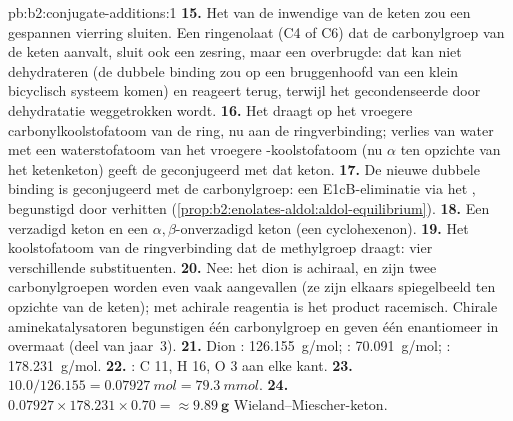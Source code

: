 \begin{solution}{pb:b2:conjugate-additions:1}
\textbf{15.} Het  van de inwendige  van de keten zou een gespannen vierring sluiten. Een
ringenolaat (C4 of C6) dat de carbonylgroep van de keten aanvalt, sluit ook een zesring, maar een overbrugde: dat 
kan niet dehydrateren (de dubbele binding zou op een bruggenhoofd van een klein bicyclisch systeem komen) en reageert terug,
terwijl het gecondenseerde  door dehydratatie weggetrokken wordt.
\textbf{16.} Het  draagt  op het vroegere carbonylkoolstofatoom van de ring, nu aan de ringverbinding; verlies
van water met een waterstofatoom van het vroegere -koolstofatoom (nu $\alpha$ ten opzichte van het ketenketon) geeft de
 geconjugeerd met dat keton.
\textbf{17.} De nieuwe dubbele binding is geconjugeerd met de carbonylgroep: een E1cB-eliminatie via het
, begunstigd door verhitten (\cref{prop:b2:enolates-aldol:aldol-equilibrium}).
\textbf{18.} Een verzadigd keton en een $\alpha,\beta$-onverzadigd keton (een cyclohexenon).
\textbf{19.} Het koolstofatoom van de ringverbinding dat de methylgroep draagt: vier verschillende substituenten.
\textbf{20.} Nee: het dion is achiraal, en zijn twee carbonylgroepen worden even vaak aangevallen (ze zijn elkaars spiegelbeeld
ten opzichte van de keten); met achirale reagentia is het product racemisch. Chirale aminekatalysatoren
begunstigen één carbonylgroep en geven één enantiomeer in overmaat (deel van jaar~3).
\textbf{21.} Dion : \qty{126.155}{g/mol}; : \qty{70.091}{g/mol}; :
\qty{178.231}{g/mol}.
\textbf{22.} : C 11, H 16, O 3 aan elke kant.
\textbf{23.} $10.0/126.155 = \qty{0.07927}{mol} = \qty{79.3}{mmol}$.
\textbf{24.} $0.07927 \times 178.231 \times 0.70 = \boldsymbol{\approx \qty{9.89}{g}}$
Wieland--Miescher-keton.
\end{solution}
